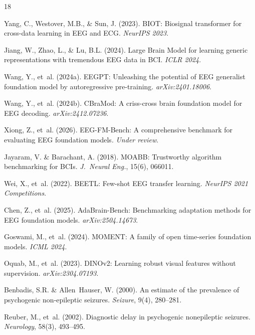 \documentclass{article}
\begin{document}

\begin{thebibliography}{18}
\small

Yang, C., Westover, M.B., \& Sun, J. (2023). BIOT: Biosignal transformer for cross-data learning in EEG and ECG. \textit{NeurIPS 2023}.

Jiang, W., Zhao, L., \& Lu, B.L. (2024). Large Brain Model for learning generic representations with tremendous EEG data in BCI. \textit{ICLR 2024}.

Wang, Y., et~al. (2024a). EEGPT: Unleashing the potential of EEG generalist foundation model by autoregressive pre-training. \textit{arXiv:2401.18006}.

Wang, Y., et~al. (2024b). CBraMod: A criss-cross brain foundation model for EEG decoding. \textit{arXiv:2412.07236}.

Xiong, Z., et~al. (2026). EEG-FM-Bench: A comprehensive benchmark for evaluating EEG foundation models. \textit{Under review}.

Jayaram, V. \& Barachant, A. (2018). MOABB: Trustworthy algorithm benchmarking for BCIs. \textit{J.\ Neural Eng.}, 15(6), 066011.

Wei, X., et~al. (2022). BEETL: Few-shot EEG transfer learning. \textit{NeurIPS 2021 Competitions}.

Chen, Z., et~al. (2025). AdaBrain-Bench: Benchmarking adaptation methods for EEG foundation models. \textit{arXiv:2504.14673}.

Goswami, M., et~al. (2024). MOMENT: A family of open time-series foundation models. \textit{ICML 2024}.

Oquab, M., et~al. (2023). DINOv2: Learning robust visual features without supervision. \textit{arXiv:2304.07193}.

Benbadis, S.R. \& Allen~Hauser, W. (2000). An estimate of the prevalence of psychogenic non-epileptic seizures. \textit{Seizure}, 9(4), 280--281.

Reuber, M., et~al. (2002). Diagnostic delay in psychogenic nonepileptic seizures. \textit{Neurology}, 58(3), 493--495.


\end{thebibliography}
\end{document}
